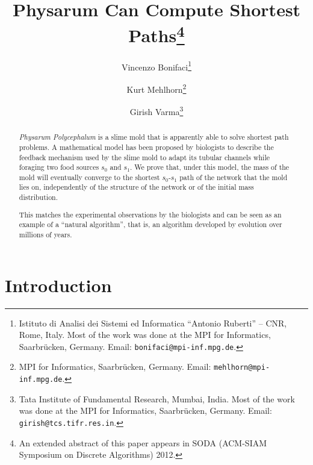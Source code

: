 \documentclass[11pt,a4paper]{article}
\begin{document}
\title{Physarum Can Compute Shortest Paths\thanks{An extended abstract of this
paper appears in SODA (ACM-SIAM Symposium on Discrete Algorithms) 2012.}}
\author{Vincenzo Bonifaci\thanks{Istituto di Analisi dei Sistemi ed Informatica
``Antonio Ruberti'' -- CNR, Rome, Italy. Most of the work was done at
the MPI for Informatics, Saarbr\"{u}cken, Germany. Email: \texttt{bonifaci@mpi-inf.mpg.de}.} 
\and 
Kurt Mehlhorn\thanks{MPI for Informatics, Saarbr\"{u}cken, Germany. Email: \texttt{mehlhorn@mpi-inf.mpg.de}.} 
\and 
Girish Varma\thanks{Tata Institute of Fundamental Research, Mumbai, India. Most
of the work was done at the MPI for Informatics, Saarbr\"{u}cken, Germany. Email: \texttt{girish@tcs.tifr.res.in}.} 
}

\maketitle



\begin{abstract}  
\emph{Physarum Polycephalum} is a slime mold that is apparently able to solve
shortest path problems. 
A mathematical model has been proposed by biologists to describe the feedback
mechanism used by the slime mold to adapt its tubular
channels while foraging two food sources $s_0$ and $s_1$. We prove
that, under this model, the mass of the mold will eventually converge
to the shortest $s_0$-$s_1$ path of the network that the mold lies on,
independently of the structure of the network or of the initial mass
distribution.  

This matches the experimental observations by the biologists and can be seen as
an example of a ``natural algorithm'', that is, an algorithm developed by
evolution over millions of years.   
\end{abstract}

\tableofcontents
\thispagestyle{empty}



\newpage

\section{Introduction}
\end{document}
